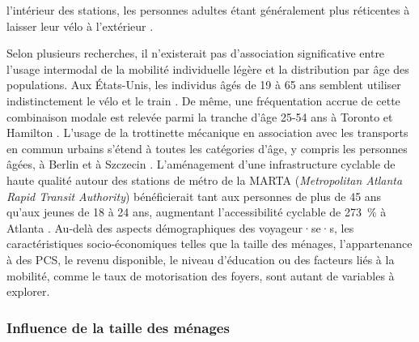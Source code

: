 \begin{refsegment}
l'intérieur des stations, les personnes adultes étant généralement plus réticentes à laisser leur vélo à l'extérieur \textcolor{blue}{\autocite[17-18]{arbis_analysis_2016}}.%

Selon plusieurs recherches, il n'existerait pas d'association significative entre l'usage intermodal de la mobilité individuelle légère et la distribution par âge des populations. Aux États-Unis, les individus âgés de 19 à 65 ans semblent utiliser indistinctement le vélo et le train \textcolor{blue}{\autocite[108]{wang_bicycle-transit_2013}}. De même, une fréquentation accrue de cette combinaison modale est relevée parmi la tranche d'âge 25-54 ans à Toronto et Hamilton \textcolor{blue}{\autocite[2~169]{chan_factors_2020}}. L'usage de la trottinette mécanique en association avec les transports en commun urbains s'étend à toutes les catégories d'âge, y compris les personnes âgées, à Berlin et à Szczecin \textcolor{blue}{\autocite[7]{kostrzewska_towards_2017}}. L'aménagement d'une infrastructure cyclable de haute qualité autour des stations de métro de la MARTA (\textsl{Metropolitan Atlanta Rapid Transit Authority}) bénéficierait tant aux personnes de plus de 45 ans qu'aux jeunes de 18 à 24 ans, augmentant l'accessibilité cyclable de 273~\% à Atlanta \textcolor{blue}{\autocite[59]{bearn_adaption_2018}}. Au-delà des aspects démographiques des voyageur·se·s, les caractéristiques socio-économiques telles que la taille des ménages, l'appartenance à des \acrfull{PCS}, le revenu disponible, le niveau d'éducation ou des facteurs liés à la mobilité, comme le taux de motorisation des foyers, sont autant de variables à explorer.%

\subsubsection*{Influence de la taille des ménages
    \label{chap2:taille-menages}
    }
    

\end{refsegment}
